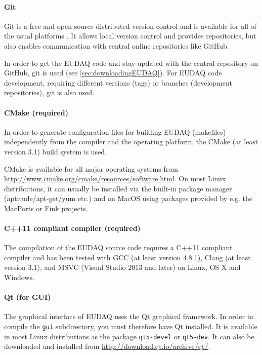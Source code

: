 \paragraph{Git}
Git is a free and open source distributed version control and is available for all of the usual platforms \cite{gitWWW}. 
It allows local version control and provides repositories, but also enables communication with central online repositories like GitHub.
   
In order to get the EUDAQ code and stay updated with the central repository on GitHub, git is used (see \autoref{sec:downloadingEUDAQ}).
For EUDAQ code development, requiring different versions (tags) or branches (development repositories), git is also used. %


\paragraph{CMake (required)}
In order to generate configuration files for building EUDAQ (makefiles) independently from the compiler and the operating platform, the CMake (at least version 3.1) build system is used.

CMake is available for all major operating systems from \url{http://www.cmake.org/cmake/resources/software.html}. 
On most Linux distributions, it can usually be installed via the built-in package manager (aptitude/apt-get/yum etc.) and on MacOS using packages provided by e.g. the MacPorts or Fink projects.

\paragraph{C++11 compliant compiler (required)}
The compilation of the EUDAQ source code requires a C++11 compliant compiler and has been tested with GCC (at least version 4.8.1), Clang (at least version 3.1), and MSVC (Visual Studio 2013 and later) on Linux, OS X and Windows.

\paragraph{Qt (for GUI)}
The graphical interface of EUDAQ uses the Qt graphical framework.
In order to compile the \texttt{gui} subdirectory, you must therefore have Qt installed.
It is available in most Linux distributions as the package \texttt{qt5-devel} or \texttt{qt5-dev}.
It can also be downloaded and installed from \url{http://download.qt.io/archive/qt/}. 

